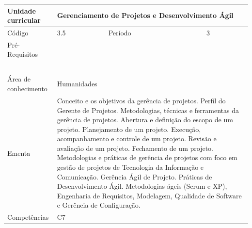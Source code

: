 \clearpage
\newpage

\begin{quadro}[ht!]
  \centering\scriptsize
\caption{Unidade Curricular Gerenciamento de Projetos e Desenvolvimento Ágil}

\begin{tabular}{|p{2.5cm}|p{2.5cm}|p{2.5cm}|p{2.5cm}|p{2.5cm}|}\hline

  Unidade curricular & \multicolumn{4}{p{10cm}|}{ Gerenciamento de Projetos e Desenvolvimento Ágil }\\\hline
  Código & 3.5 & Período & \multicolumn{2}{p{5cm}|}{ 3 }\\\hline
  Pré-Requisitos & \multicolumn{4}{p{10cm}|}{  } \\\hline
  \cellcolor{blue1}{ CH PRESENCIAL } &
    \cellcolor{blue1}{CH EAD Síncrona} &
    \cellcolor{blue1}{CH EAD Síncrona Mediada} &
    \cellcolor{blue1}{CH EAD Assíncrona} &
    \cellcolor{blue1}{CH APCC} \\\hline
  \cellcolor{blue1}{ 0 } &
    \cellcolor{blue1}{ 0 } &
    \cellcolor{blue1}{ 30 } &
    \cellcolor{blue1}{ 30 } &
    \cellcolor{blue1}{0} \\\hline
  \cellcolor{blue1}{ CH Teórica } &
    \cellcolor{blue1}{CH Prática} &
    \cellcolor{blue1}{CH Humanidades} &
    \cellcolor{blue1}{CH Extensão} &
    \cellcolor{blue1}{CH EAD TOTAL} \\\hline
  \cellcolor{blue1}{ 30 } &
    \cellcolor{blue1}{ 30 } &
    \cellcolor{blue1}{ 60 } &
    \cellcolor{blue1}{ 0 } &
    \cellcolor{blue1}{ 60 } \\\hline
  \cellcolor{blue1}{CARGA-HORÁRIA TOTAL} & \multicolumn{4}{p{10cm}|}{ \cellcolor{blue1}{ 60 } } \\\hline
  Área de conhecimento & \multicolumn{4}{p{10cm}|}{ Humanidades } \\\hline
  Ementa & \multicolumn{4}{p{10cm}|}{ Conceito e os objetivos da gerência de projetos. Perfil do Gerente de Projetos. Metodologias, técnicas e ferramentas da gerência de projetos. Abertura e definição do escopo de um projeto. Planejamento de um projeto. Execução, acompanhamento e controle de um projeto. Revisão e avaliação de um projeto. Fechamento de um projeto. Metodologias e práticas de gerência de projetos com foco em gestão de projetos de Tecnologia da Informação e Comunicação. Gerência Ágil de Projeto. Práticas de Desenvolvimento Ágil. Metodologias ágeis (Scrum e XP), Engenharia de Requisitos, Modelagem, Qualidade de Software e Gerência de Configuração. } \\\hline
  Competências & \multicolumn{4}{p{10cm}|}{ C7 } \\\hline


  
	\end{tabular}

\end{quadro}


